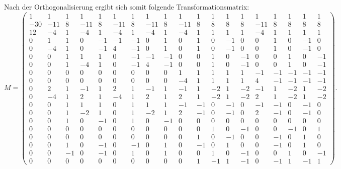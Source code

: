 Nach  der Orthogonalisierung ergibt sich somit folgende Transformationsmatrix:
\begin{equation}
 M = \left( \begin{smallmatrix}
 1 & 1 & 1 & 1 & 1 & 1 & 1 & 1 & 1 & 1 & 1 & 1 & 1 & 1 & 1 & 1 & 1 & 1 & 1 \\
 -30 & -11 & 8 & -11 & 8 & -11 & 8 & -11 & 8 & -11 & 8 & 8 & 8 & 8 & -11 & 8 & 8 & 8 & 8 \\
 12 & -4 & 1 & -4 & 1 & -4 & 1 & -4 & 1 & -4 & 1 & 1 & 1 & 1 & -4 & 1 & 1 & 1 & 1 \\
 0 & 1 & 1 & 0 & -1 & -1 & -1 & 0 & 1 & 0 & 1 & 0 & -1 & 0 & 0 & 1 & 0 & -1 & 0 \\
 0 & -4 & 1 & 0 & -1 & 4 & -1 & 0 & 1 & 0 & 1 & 0 & -1 & 0 & 0 & 1 & 0 & -1 & 0 \\
 0 & 0 & 1 & 1 & 1 & 0 & -1 & -1 & -1 & 0 & 0 & 1 & 0 & -1 & 0 & 0 & 1 & 0 & -1 \\
 0 & 0 & 1 & -4 & 1 & 0 & -1 & 4 & -1 & 0 & 0 & 1 & 0 & -1 & 0 & 0 & 1 & 0 & -1 \\
 0 & 0 & 0 & 0 & 0 & 0 & 0 & 0 & 0 & 1 & 1 & 1 & 1 & 1 & -1 & -1 & -1 & -1 & -1 \\
 0 & 0 & 0 & 0 & 0 & 0 & 0 & 0 & 0 & -4 & 1 & 1 & 1 & 1 & 4 & -1 & -1 & -1 & -1 \\
 0 & 2 & 1 & -1 & 1 & 2 & 1 & -1 & 1 & -1 & 1 & -2 & 1 & -2 & -1 & 1 & -2 & 1 & -2 \\
 0 & -4 & 1 & 2 & 1 & -4 & 1 & 2 & 1 & 2 & 1 & -2 & 1 & -2 & 2 & 1 & -2 & 1 & -2 \\
 0 & 0 & 1 & 1 & 1 & 0 & 1 & 1 & 1 & -1 & -1 & 0 & -1 & 0 & -1 & -1 & 0 & -1 & 0 \\
 0 & 0 & 1 & -2 & 1 & 0 & 1 & -2 & 1 & 2 & -1 & 0 & -1 & 0 & 2 & -1 & 0 & -1 & 0 \\
 0 & 0 & 1 & 0 & -1 & 0 & 1 & 0 & -1 & 0 & 0 & 0 & 0 & 0 & 0 & 0 & 0 & 0 & 0 \\
 0 & 0 & 0 & 0 & 0 & 0 & 0 & 0 & 0 & 0 & 0 & 1 & 0 & -1 & 0 & 0 & -1 & 0 & 1 \\
 0 & 0 & 0 & 0 & 0 & 0 & 0 & 0 & 0 & 0 & 1 & 0 & -1 & 0 & 0 & -1 & 0 & 1 & 0 \\
 0 & 0 & 1 & 0 & -1 & 0 & -1 & 0 & 1 & 0 & -1 & 0 & 1 & 0 & 0 & -1 & 0 & 1 & 0 \\
 0 & 0 & -1 & 0 & -1 & 0 & 1 & 0 & 1 & 0 & 0 & 1 & 0 & -1 & 0 & 0 & 1 & 0 & -1 \\
 0 & 0 & 0 & 0 & 0 & 0 & 0 & 0 & 0 & 0 & 1 & -1 & 1 & -1 & 0 & -1 & 1 & -1 & 1
\end{smallmatrix} \right).
\end{equation}
